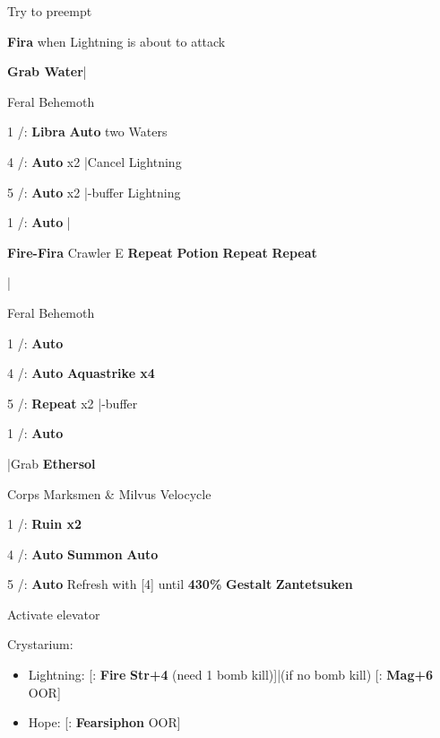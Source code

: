 \begin{mainlist}
	\item Try to preempt
	\item {} \textbf{Fira} when Lightning is about to attack
	\item \textbf{Grab Water}|\skip
\end{mainlist}
\begin{fight}{Feral Behemoth}
	\item [1] \rav/\com: \textbf{Libra} \to \textbf{Auto} two Waters
	\item [4] \rav/\rav: \textbf{Auto} x2 |Cancel Lightning
	\item [5] \rav/\rav: \textbf{Auto} x2 |\com-buffer Lightning
	\item [1] \rav/\com: \textbf{Auto} |\skip
\end{fight}
\begin{mainlist}
	\item {} \textbf{Fire-Fira} Crawler E \to [6] \textbf{Repeat} \to \textbf{\textbf{Potion}} \to \textbf{Repeat} \to [1] \textbf{Repeat}
	\item {}|
\end{mainlist}
\begin{fight}{Feral Behemoth}
	\item [1] \com/\rav: \textbf{Auto}
	\item [4] \rav/\rav: \textbf{Auto} \to \textbf{Aquastrike x4}
	\item [5] \rav/\rav: \textbf{Repeat} x2 |\com-buffer
	\item [1] \com/\rav: \textbf{Auto}
\end{fight}
\begin{mainlist}
	\item \skip|Grab \textbf{Ethersol}
\end{mainlist}
\begin{fight}{Corps Marksmen \& Milvus Velocycle}
	\item [1] \com/\rav: \textbf{Ruin x2}
	\item [4] \rav/\rav: \textbf{Auto} \to \textbf{Summon} \to \textbf{Auto}
	\item [5] \rav/\rav: \textbf{Auto} \to Refresh with [4] until \textbf{430\%} \to \textbf{Gestalt} \to \textbf{Zantetsuken}
	\item Activate elevator
\end{fight}
\begin{menu}
	\item Crystarium:
	\begin{itemize}
		\item Lightning: [\rav: \textbf{Fire} \to \textbf{Str+4} (need 1 bomb kill)]|(if no bomb kill) [\com: \textbf{Mag+6} OOR]
		\item Hope: [\rav: \textbf{Fearsiphon} OOR]
	\end{itemize}
\end{menu}
